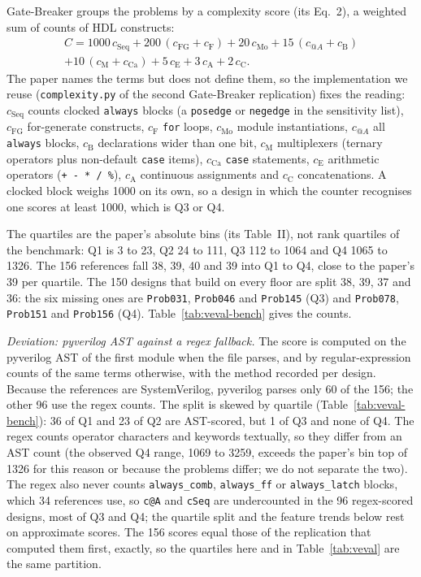 \documentclass[conference]{IEEEtran}
\newcommand{\code}[1]{\texttt{#1}}
\begin{document}
Gate-Breaker groups the problems by a complexity score (its Eq.~2), a weighted sum of
counts of HDL constructs:
\begin{multline}
C = 1000\,c_{\mathrm{Seq}} + 200\,(c_{\mathrm{FG}} + c_{\mathrm F}) + 20\,c_{\mathrm{Mo}}
 + 15\,(c_{@A} + c_{\mathrm B}) \\
 + 10\,(c_{\mathrm M} + c_{\mathrm{Ca}}) + 5\,c_{\mathrm E}
 + 3\,c_{\mathrm A} + 2\,c_{\mathrm C}.
\label{eq:complexity}
\end{multline}
The paper names the terms but does not define them, so the implementation we reuse
(\code{complexity.py} of the second Gate-Breaker replication) fixes the reading:
$c_{\mathrm{Seq}}$ counts clocked \code{always} blocks (a \code{posedge} or \code{negedge} in
the sensitivity list), $c_{\mathrm{FG}}$ for-generate constructs, $c_{\mathrm F}$ \code{for}
loops, $c_{\mathrm{Mo}}$ module instantiations, $c_{@A}$ all \code{always} blocks,
$c_{\mathrm B}$ declarations wider than one bit, $c_{\mathrm M}$ multiplexers (ternary
operators plus non-default \code{case} items), $c_{\mathrm{Ca}}$ \code{case} statements,
$c_{\mathrm E}$ arithmetic operators (\code{+ - * / \%}), $c_{\mathrm A}$ continuous
assignments and $c_{\mathrm C}$ concatenations. A clocked block weighs 1000 on its own, so a
design in which the counter recognises one scores at least 1000, which is Q3 or Q4.

The quartiles are the paper's absolute bins (its Table~II), not rank quartiles of the
benchmark: Q1 is 3 to 23, Q2 24 to 111, Q3 112 to 1064 and Q4 1065 to 1326. The 156 references
fall 38, 39, 40 and 39 into Q1 to Q4, close to the paper's 39 per quartile. The 150
designs that build on every floor are split 38, 39, 37 and 36: the six missing ones are
\code{Prob031}, \code{Prob046} and \code{Prob145} (Q3) and \code{Prob078}, \code{Prob151} and
\code{Prob156} (Q4). Table~\ref{tab:veval-bench} gives the counts.

\emph{Deviation: pyverilog AST against a regex fallback.} The score is computed on the
pyverilog AST of the first module when the file parses, and by regular-expression counts of
the same terms otherwise, with the method recorded per design. Because the references are
SystemVerilog, pyverilog parses only 60 of the 156; the other 96 use the regex counts. The
split is skewed by quartile (Table~\ref{tab:veval-bench}): 36 of Q1 and 23 of Q2 are
AST-scored, but 1 of Q3 and none of Q4. The regex counts operator characters and keywords
textually, so they differ from an AST count (the observed Q4 range, 1069 to 3259, exceeds the
paper's bin top of 1326 for this reason or because the problems differ; we do not separate the
two). The regex also never counts \code{always\_comb}, \code{always\_ff} or \code{always\_latch}
blocks, which 34 references use, so \code{c@A} and \code{cSeq} are undercounted in the 96
regex-scored designs, most of Q3 and Q4; the quartile split and the feature trends below rest on
approximate scores. The 156 scores equal those of the replication that computed them first, exactly, so the
quartiles here and in Table~\ref{tab:veval} are the same partition.
\end{document}
